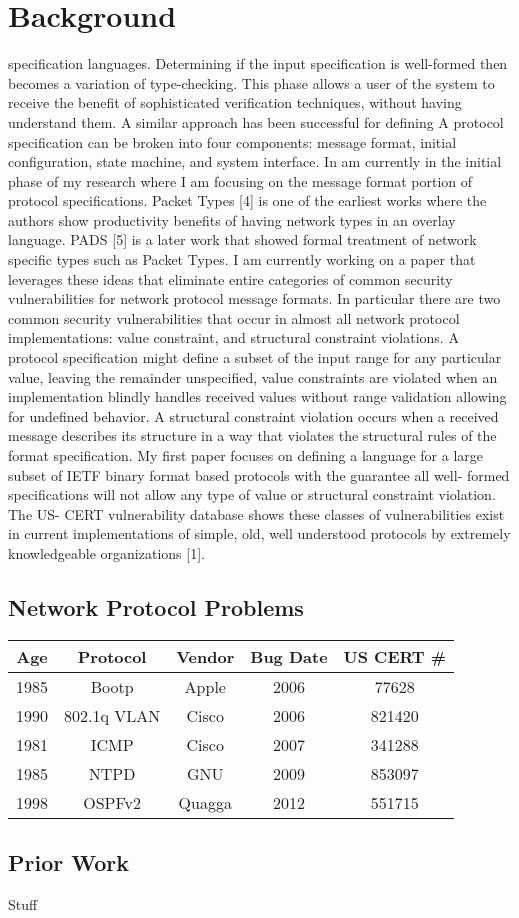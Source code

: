\section{Background}
     
specification languages. Determining if the input specification is well-formed
then becomes a variation of type-checking. This phase allows a user of the
system to receive the benefit of sophisticated verification techniques, without
having understand them. A similar approach has been successful for defining
A protocol specification can be broken into four components: message format,
initial configuration, state machine, and system interface. In am currently in
the initial phase of my research where I am focusing on the message format
portion of protocol specifications. Packet Types [4] is one of the earliest
works where the authors show productivity benefits of having network types in an
overlay language. PADS [5] is a later work that showed formal treatment of 
network specific types such as Packet Types. I am currently working on a paper
that leverages these ideas that eliminate entire categories of common security
vulnerabilities for network protocol message formats. In particular there are
two common security vulnerabilities that occur in almost all network protocol
implementations: value constraint, and structural constraint violations. A
protocol specification might define a subset of the input range for any
particular value, leaving the remainder unspecified, value constraints are
violated when an implementation blindly handles received values without range
validation allowing for undefined behavior. A structural constraint violation
occurs when a received message describes its structure in a way that violates
the structural rules of the format specification. My first paper focuses on
defining a language for a large subset of IETF binary format based protocols
with the guarantee all well- formed specifications will not allow any type of
value or structural constraint violation. The US- CERT vulnerability database
shows these classes of vulnerabilities exist in current implementations of
simple, old, well understood protocols by extremely knowledgeable organizations [1].

\subsection{Network Protocol Problems }

\begin{tabular}{|c|c|c|c|c|}
   \hline
   Age & Protocol & Vendor & Bug Date & US CERT \# \\ \hline
   \hline
   1985 & Bootp & Apple & 2006 & 77628 \\ \hline
   1990 & 802.1q VLAN & Cisco & 2006 & 821420 \\ \hline
   1981 & ICMP & Cisco & 2007 & 341288 \\ \hline
   1985 & NTPD & GNU & 2009 & 853097 \\ \hline
   1998 & OSPFv2 & Quagga & 2012 & 551715 \\ \hline
\end{tabular}

\subsection{Prior Work}

Stuff \cite{packet_types}
